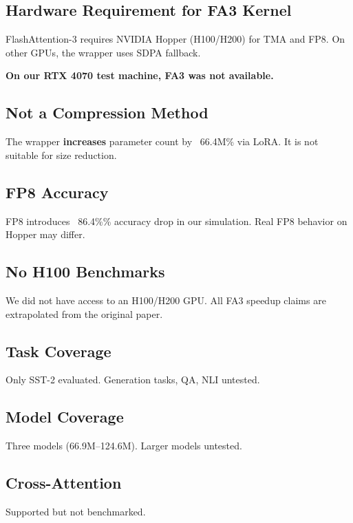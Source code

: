\subsection{Hardware Requirement for FA3 Kernel}

FlashAttention-3 requires NVIDIA Hopper (H100/H200) for TMA and FP8. 
On other GPUs, the wrapper uses SDPA fallback.

\textbf{On our RTX 4070 test machine, FA3 was not available.}

\subsection{Not a Compression Method}

The wrapper \textbf{increases} parameter count by ~66.4M\% via LoRA. 
It is not suitable for size reduction.

\subsection{FP8 Accuracy}

FP8 introduces ~86.4\%\% accuracy drop in our simulation. Real 
FP8 behavior on Hopper may differ.

\subsection{No H100 Benchmarks}

We did not have access to an H100/H200 GPU. All FA3 speedup claims are 
extrapolated from the original paper.

\subsection{Task Coverage}

Only SST-2 evaluated. Generation tasks, QA, NLI untested.

\subsection{Model Coverage}

Three models (66.9M--124.6M). Larger models untested.

\subsection{Cross-Attention}

Supported but not benchmarked.


